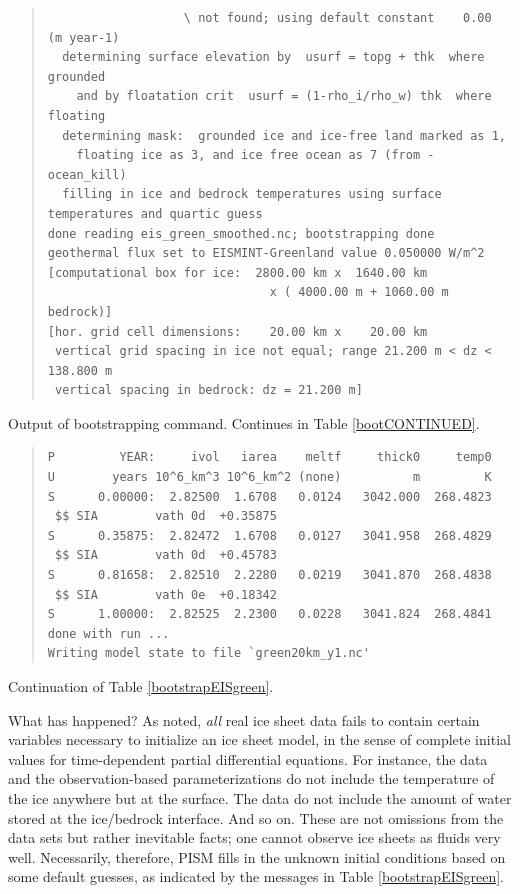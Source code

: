 \documentclass[11pt,final]{amsart}
\begin{document}
\begin{table}
\begin{quote}
\begin{verbatim}
                   \ not found; using default constant    0.00 (m year-1)
  determining surface elevation by  usurf = topg + thk  where grounded
    and by floatation crit  usurf = (1-rho_i/rho_w) thk  where floating
  determining mask:  grounded ice and ice-free land marked as 1,
    floating ice as 3, and ice free ocean as 7 (from -ocean_kill)
  filling in ice and bedrock temperatures using surface temperatures and quartic guess
done reading eis_green_smoothed.nc; bootstrapping done
geothermal flux set to EISMINT-Greenland value 0.050000 W/m^2
[computational box for ice:  2800.00 km x  1640.00 km
                               x ( 4000.00 m + 1060.00 m bedrock)]
[hor. grid cell dimensions:    20.00 km x    20.00 km
 vertical grid spacing in ice not equal; range 21.200 m < dz < 138.800 m
 vertical spacing in bedrock: dz = 21.200 m]
\end{verbatim}
\end{quote}
\normalsize
\bigskip

\caption{Output of bootstrapping command.  Continues in Table \ref{bootCONTINUED}.}
\label{bootstrapEISgreen}
\end{table}

\begin{table}
\scriptsize
\begin{quote}
\begin{verbatim}
P         YEAR:     ivol   iarea    meltf     thick0     temp0
U        years 10^6_km^3 10^6_km^2 (none)          m         K
S      0.00000:  2.82500  1.6708   0.0124   3042.000  268.4823
 $$ SIA        vath 0d  +0.35875
S      0.35875:  2.82472  1.6708   0.0127   3041.958  268.4829
 $$ SIA        vath 0d  +0.45783
S      0.81658:  2.82510  2.2280   0.0219   3041.870  268.4838
 $$ SIA        vath 0e  +0.18342
S      1.00000:  2.82525  2.2300   0.0228   3041.824  268.4841
done with run ... 
Writing model state to file `green20km_y1.nc'
\end{verbatim}
\end{quote}
\normalsize
\bigskip

\caption{Continuation of Table \ref{bootstrapEISgreen}.}
\label{bootCONTINUED}
\end{table}

What has happened?  As noted, \emph{all} real ice sheet data fails to contain certain variables necessary to initialize an ice sheet model, in the sense of complete initial values for time-dependent partial differential equations.  For instance, the data and the observation-based parameterizations do not include the temperature of the ice anywhere but at the surface.  The data do not include the amount of water stored at the ice/bedrock interface.  And so on.  These are not omissions from the data sets but rather inevitable facts; one cannot observe ice sheets as fluids very well.  Necessarily, therefore, PISM fills in the unknown initial conditions based on some default guesses, as indicated by the messages in Table \ref{bootstrapEISgreen}.
\end{document}
